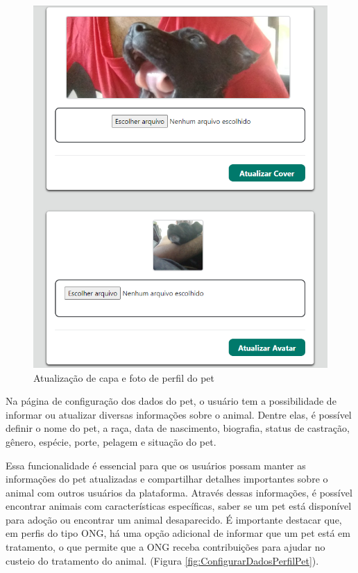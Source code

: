 \begin{figure}[htb]
     \centering
     \includegraphics[width=12cm]{arquivos/Figuras/image26.png}
     \caption{Atualização de capa e foto de perfil do pet}
     \label{fig:EdiçãoCapaFotoPerfilPet}
\end{figure}

Na página de configuração dos dados do pet, o usuário tem a possibilidade de informar ou atualizar diversas informações sobre o animal. Dentre elas, é possível definir o nome do pet, a raça, data de nascimento, biografia, status de castração, gênero, espécie, porte, pelagem e situação do pet.

Essa funcionalidade é essencial para que os usuários possam manter as informações do pet atualizadas e compartilhar detalhes importantes sobre o animal com outros usuários da plataforma. Através dessas informações, é possível encontrar animais com características específicas, saber se um pet está disponível para adoção ou encontrar um animal desaparecido. É importante destacar que, em perfis do tipo ONG, há uma opção adicional de informar que um pet está em tratamento, o que permite que a ONG receba contribuições para ajudar no custeio do tratamento do animal. (Figura \ref{fig:ConfigurarDadosPerfilPet}).

